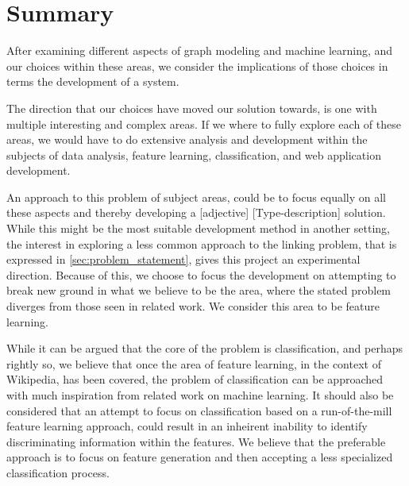 \section{Summary}

After examining different aspects of graph modeling and machine learning, and our choices within these areas, we consider the implications of those choices in terms the development of a system.

The direction that our choices have moved our solution towards, is one with multiple interesting and complex areas.%
If we where to fully explore each of these areas, we would have to do extensive analysis and development within the subjects of data analysis, feature learning, classification, and web application development.

An approach to this problem of subject areas, could be to focus equally on all these aspects and thereby developing a [adjective] [Type-description] solution. While this might be the most suitable development method in another setting, the interest in exploring a less common approach to the linking problem, that is expressed in \cref{sec:problem_statement}, gives this project an experimental direction. Because of this, we choose to focus the development on attempting to break new ground in what we believe to be the area, where the stated problem diverges from those seen in related work. We consider this area to be feature learning. 

While it can be argued that the core of the problem is classification, and perhaps rightly so, we believe that once the area of feature learning, in the context of Wikipedia, has been covered, the problem of classification can be approached with much inspiration from related work on machine learning. It should also be considered that an attempt to focus on classification based on a run-of-the-mill feature learning approach, could result in an inheirent inability to identify discriminating information within the features. We believe that the preferable approach is to focus on feature generation and then accepting a less specialized classification process.

